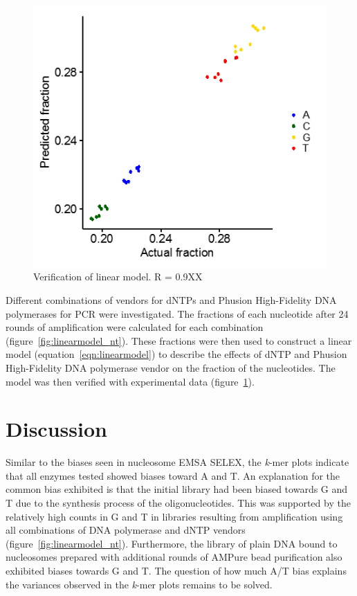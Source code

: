 \documentclass[parskip=full, numbers=noenddot]{scrreprt}
\begin{document}
\begin{figure}[htpb]
  \centering
  \includegraphics[width=\textwidth]{linearmodel_plot}
  \caption{Verification of linear model. R = 0.9XX}
  \label{fig:linearmodel_ver}
\end{figure}

Different combinations of vendors for dNTPs and Phusion High-Fidelity DNA polymerases for PCR were investigated.  The fractions of each nucleotide after 24 rounds of amplification were calculated for each combination (figure~\ref{fig:linearmodel_nt}).  These fractions were then used to construct a linear model (equation~\ref{eqn:linearmodel}) to describe the effects of dNTP and Phusion High-Fidelity DNA polymerase vendor on the fraction of the nucleotides. The model was then verified with experimental data (figure~\ref{fig:linearmodel_ver}).

\section{Discussion}
\label{sec:pcrbias_discussion}


Similar to the biases seen in nucleosome EMSA SELEX, the \emph{k}-mer plots indicate that all enzymes tested showed biases toward A and T.  An explanation for the common bias exhibited is that the initial library had been biased towards G and T due to the synthesis process of the oligonucleotides.  This was supported by the relatively high counts in G and T in libraries resulting from amplification using all combinations of DNA polymerase and dNTP vendors (figure~\ref{fig:linearmodel_nt}).  Furthermore, the library of plain DNA bound to nucleosomes prepared with additional rounds of AMPure bead purification also exhibited biases towards G and T.  The question of how much A/T bias explains the variances observed in the \emph{k}-mer plots remains to be solved.
\end{document}
